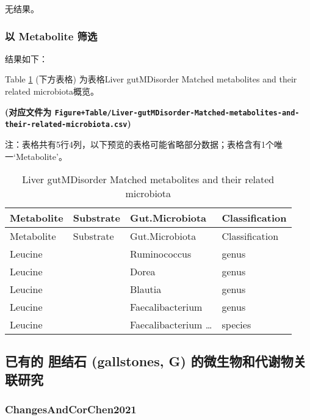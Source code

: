 \documentclass[
]{article}
\begin{document}
无结果。

\hypertarget{ux4ee5-metabolite-ux7b5bux9009}{%
\subsubsection{以 Metabolite 筛选}\label{ux4ee5-metabolite-ux7b5bux9009}}

结果如下：

Table \ref{tab:Liver-gutMDisorder-Matched-metabolites-and-their-related-microbiota} (下方表格) 为表格Liver gutMDisorder Matched metabolites and their related microbiota概览。

\textbf{(对应文件为 \texttt{Figure+Table/Liver-gutMDisorder-Matched-metabolites-and-their-related-microbiota.csv})}

\begin{center}\begin{tcolorbox}[colback=gray!10, colframe=gray!50, width=0.9\linewidth, arc=1mm, boxrule=0.5pt]注：表格共有5行4列，以下预览的表格可能省略部分数据；表格含有1个唯一`Metabolite'。
\end{tcolorbox}
\end{center}

\begin{longtable}[]{@{}llll@{}}
\caption{\label{tab:Liver-gutMDisorder-Matched-metabolites-and-their-related-microbiota}Liver gutMDisorder Matched metabolites and their related microbiota}\tabularnewline
\toprule
Metabolite & Substrate & Gut.Microbiota & Classification\tabularnewline
\midrule
\endfirsthead
\toprule
Metabolite & Substrate & Gut.Microbiota & Classification\tabularnewline
\midrule
\endhead
Leucine & & Ruminococcus & genus\tabularnewline
Leucine & & Dorea & genus\tabularnewline
Leucine & & Blautia & genus\tabularnewline
Leucine & & Faecalibacterium & genus\tabularnewline
Leucine & & Faecalibacterium \ldots{} & species\tabularnewline
\bottomrule
\end{longtable}

\hypertarget{ux5df2ux6709ux7684-ux80c6ux7ed3ux77f3-gallstones-g-ux7684ux5faeux751fux7269ux548cux4ee3ux8c22ux7269ux5173ux8054ux7814ux7a76}{%
\subsection{已有的 胆结石 (gallstones, G) 的微生物和代谢物关联研究}\label{ux5df2ux6709ux7684-ux80c6ux7ed3ux77f3-gallstones-g-ux7684ux5faeux751fux7269ux548cux4ee3ux8c22ux7269ux5173ux8054ux7814ux7a76}}

\hypertarget{changesandcorchen2021}{%
\subsubsection{ChangesAndCorChen2021}\label{changesandcorchen2021}}
\end{document}
